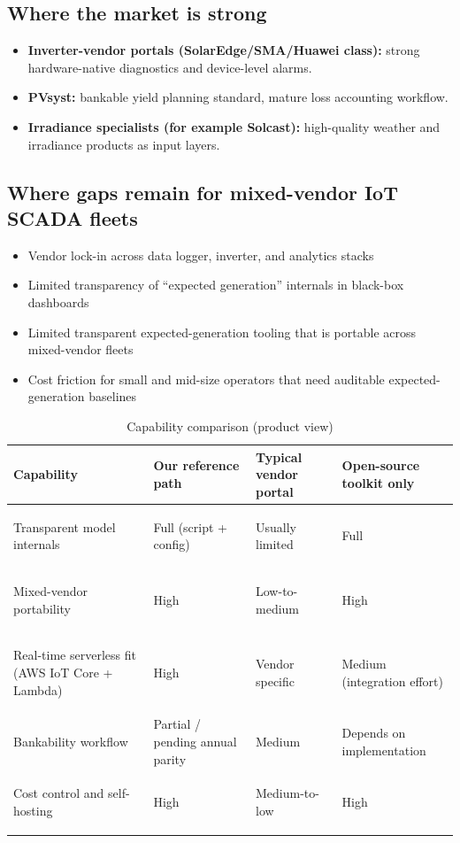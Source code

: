 \documentclass[11pt,a4paper]{article}
\begin{document}
\subsection{Where the market is strong}
\begin{itemize}
  \item \textbf{Inverter-vendor portals (SolarEdge/SMA/Huawei class):}
  strong hardware-native diagnostics and device-level alarms.
  \item \textbf{PVsyst:} bankable yield planning standard, mature loss accounting workflow.
  \item \textbf{Irradiance specialists (for example Solcast):}
  high-quality weather and irradiance products as input layers.
\end{itemize}

\subsection{Where gaps remain for mixed-vendor IoT SCADA fleets}
\begin{itemize}
  \item Vendor lock-in across data logger, inverter, and analytics stacks
  \item Limited transparency of ``expected generation'' internals in black-box dashboards
  \item Limited transparent expected-generation tooling that is portable across mixed-vendor fleets
  \item Cost friction for small and mid-size operators that need auditable expected-generation baselines
\end{itemize}

\begin{table}[h]
\centering
\small
\caption{Capability comparison (product view)}
\begin{tabularx}{\linewidth}{>{\bfseries\raggedright\arraybackslash}p{3.5cm} >{\raggedright\arraybackslash}p{3.2cm} >{\raggedright\arraybackslash}p{3.2cm} >{\raggedright\arraybackslash}X}
\toprule
Capability & Our reference path & Typical vendor portal & Open-source toolkit only \\
\midrule
Transparent model internals & Full (script + config) & Usually limited & Full \\
Mixed-vendor portability & High & Low-to-medium & High \\
Real-time serverless fit (AWS IoT Core + Lambda) & High & Vendor specific & Medium (integration effort) \\
Bankability workflow & Partial / pending annual parity & Medium & Depends on implementation \\
Cost control and self-hosting & High & Medium-to-low & High \\
\bottomrule
\end{tabularx}
\end{table}
\end{document}
